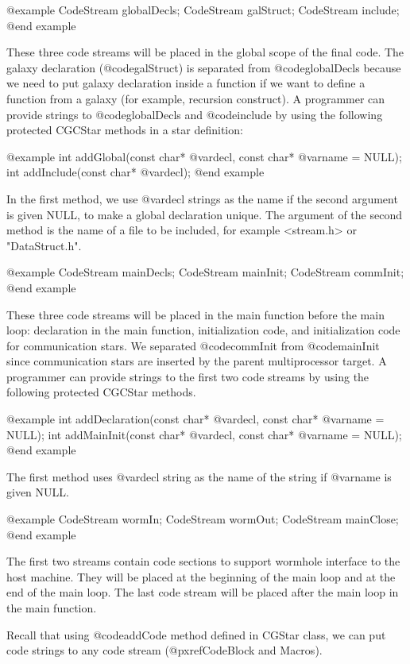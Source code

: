 {@example
CodeStream globalDecls;
CodeStream galStruct;
CodeStream include;
@end example

These three code streams will be placed in the global scope of the final code.
The galaxy declaration (@code{galStruct}) is separated from @code{globalDecls}
because we need to put galaxy declaration inside a function if we want to
define a function from a galaxy (for example, recursion construct).
A programmer can provide strings to @code{globalDecls} and @code{include}
by using the following protected CGCStar methods in a star definition:

@example
int addGlobal(const char* @var{decl}, const char* @var{name} = NULL);
int addInclude(const char* @var{decl});
@end example

In the first method, we use @var{decl} strings as the name if the second
argument is given NULL, to make a global declaration unique.
The argument of the second method is the name of a file to be included, for
example <stream.h> or "DataStruct.h".

@example
CodeStream mainDecls;
CodeStream mainInit;
CodeStream commInit;
@end example

These three code streams will be placed in the main function before the
main loop: declaration in the main function, initialization code, and
initialization code for communication stars. We separated @code{commInit}
from @code{mainInit} since communication stars are inserted by the parent
multiprocessor target.
A programmer can provide strings to the first
two code streams by using the following protected CGCStar methods.

@example
int addDeclaration(const char* @var{decl}, const char* @var{name} = NULL);
int addMainInit(const char* @var{decl}, const char* @var{name} = NULL);
@end example

The first method uses @var{decl} string as the name of the string if
@var{name} is given NULL.

@example
CodeStream wormIn;
CodeStream wormOut;
CodeStream mainClose;
@end example

The first two streams contain code sections to support wormhole interface
to the host machine. They will be placed at the beginning of the main loop and
at the end of the main loop. The last code stream will be placed after the
main loop in the main function.

Recall that using @code{addCode} method defined in CGStar class, we can
put code strings to any code stream (@pxref{CodeBlock and Macros}).

}
